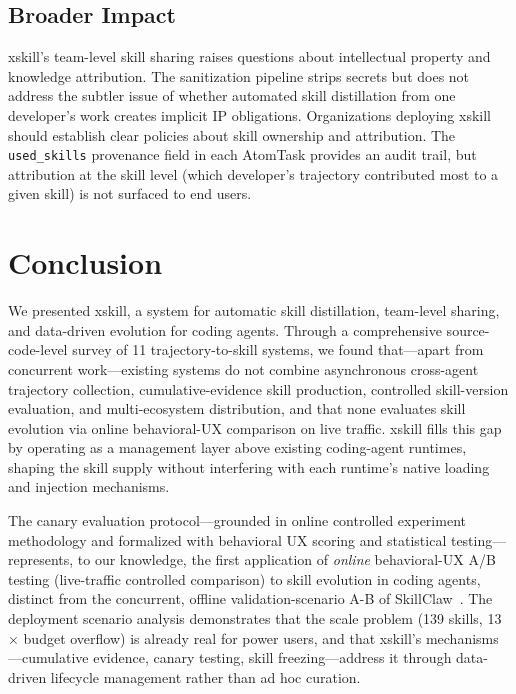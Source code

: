 \documentclass{article}
\begin{document}
\subsection{Broader Impact}

xskill's team-level skill sharing raises questions about intellectual property and knowledge attribution. The sanitization pipeline strips secrets but does not address the subtler issue of whether automated skill distillation from one developer's work creates implicit IP obligations. Organizations deploying xskill should establish clear policies about skill ownership and attribution. The \texttt{used\_skills} provenance field in each AtomTask provides an audit trail, but attribution at the skill level (which developer's trajectory contributed most to a given skill) is not surfaced to end users.

\section{Conclusion}
\label{sec:conclusion}

We presented xskill, a system for automatic skill distillation, team-level sharing, and data-driven evolution for coding agents. Through a comprehensive source-code-level survey of 11 trajectory-to-skill systems, we found that---apart from concurrent work---existing systems do not combine asynchronous cross-agent trajectory collection, cumulative-evidence skill production, controlled skill-version evaluation, and multi-ecosystem distribution, and that none evaluates skill evolution via online behavioral-UX comparison on live traffic. xskill fills this gap by operating as a management layer above existing coding-agent runtimes, shaping the skill supply without interfering with each runtime's native loading and injection mechanisms.

The canary evaluation protocol---grounded in online controlled experiment methodology and formalized with behavioral UX scoring and statistical testing---represents, to our knowledge, the first application of \emph{online} behavioral-UX A/B testing (live-traffic controlled comparison) to skill evolution in coding agents, distinct from the concurrent, offline validation-scenario A-B of SkillClaw~\citep{amapml2026skillclaw}. The deployment scenario analysis demonstrates that the scale problem (139 skills, 13$\times$ budget overflow) is already real for power users, and that xskill's mechanisms---cumulative evidence, canary testing, skill freezing---address it through data-driven lifecycle management rather than ad hoc curation.
\end{document}
